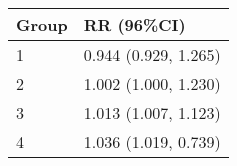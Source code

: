 \begin{tabular}{ll}
  \hline
Group & RR (96\%CI) \\ 
  \hline
   1 & 0.944 (0.929, 1.265) \\ 
     2 & 1.002 (1.000, 1.230) \\ 
     3 & 1.013 (1.007, 1.123) \\ 
     4 & 1.036 (1.019, 0.739) \\ 
   \hline
\end{tabular}

